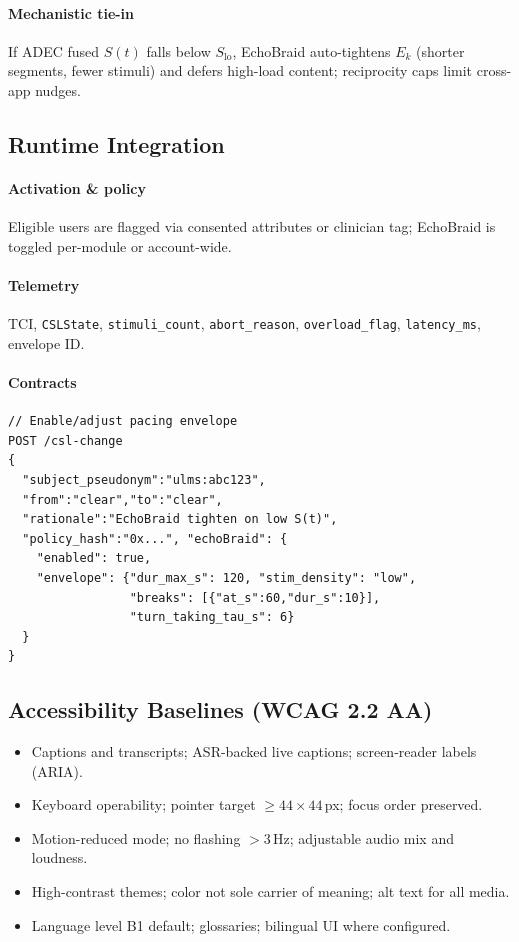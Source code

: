 \documentclass[11pt]{article}
\theoremstyle{plain}
\begin{document}
\paragraph{Mechanistic tie-in}
If ADEC fused $S(t)$ falls below $S_{\mathrm{lo}}$, EchoBraid auto-tightens $E_k$ (shorter segments, fewer stimuli) and defers high-load content; reciprocity caps limit cross-app nudges.

\subsection{Runtime Integration}
\paragraph{Activation \& policy}
Eligible users are flagged via consented attributes or clinician tag; EchoBraid is toggled per-module or account-wide.
\paragraph{Telemetry}
TCI, \texttt{CSLState}, \texttt{stimuli\_count}, \texttt{abort\_reason}, \texttt{overload\_flag}, \texttt{latency\_ms}, envelope ID.
\paragraph{Contracts}
\begin{verbatim}
// Enable/adjust pacing envelope
POST /csl-change
{
  "subject_pseudonym":"ulms:abc123",
  "from":"clear","to":"clear",
  "rationale":"EchoBraid tighten on low S(t)",
  "policy_hash":"0x...", "echoBraid": {
    "enabled": true,
    "envelope": {"dur_max_s": 120, "stim_density": "low",
                 "breaks": [{"at_s":60,"dur_s":10}],
                 "turn_taking_tau_s": 6}
  }
}
\end{verbatim}

\subsection{Accessibility Baselines (WCAG 2.2 AA)}
\begin{itemize}
  \item Captions and transcripts; ASR-backed live captions; screen-reader labels (ARIA).
  \item Keyboard operability; pointer target $\ge 44\times44$\,px; focus order preserved.
  \item Motion-reduced mode; no flashing $>3$\,Hz; adjustable audio mix and loudness.
  \item High-contrast themes; color not sole carrier of meaning; alt text for all media.
  \item Language level B1 default; glossaries; bilingual UI where configured.
\end{itemize}
\end{document}
